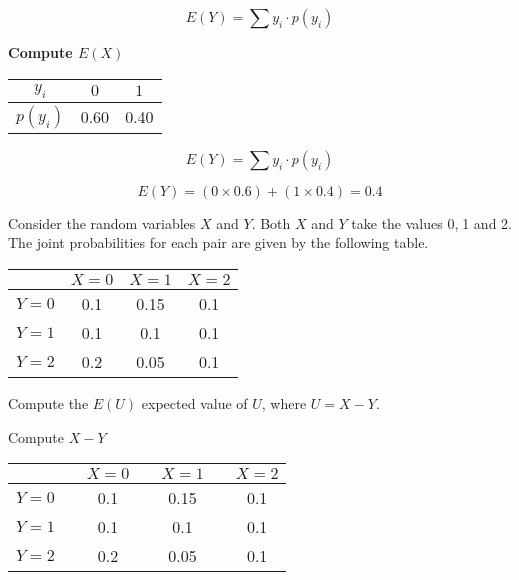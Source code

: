 \documentclass[]{report}
\begin{document}
	\[ E(Y) =  \sum  y_i \cdot p(y_i)   \]
	
	
	
	\textbf{Compute $E(X)$}
	\begin{center}
		\begin{tabular}{|c|c|c|}
			\hline $y_i$ & $0$ & $1$  \\ 
			\hline $p(y_i)$& 0.60 & 0.40 \\
			\hline 
		\end{tabular} 
	\end{center}
	
	\[ E(Y) =  \sum  y_i \cdot p(y_i)   \]
	
	\[ E(Y) = (0 \times 0.6) +  (1 \times 0.4)  =0.4 \]
	
	
	
	
	
	Consider the random variables $X$ and $Y$. Both $X$ and $Y$ take the values 0,$\;$1 and 2. 
	The joint probabilities for each pair are given by the following table.
	\begin{center}
		\begin{tabular}{|c|c|c|c|}
			\hline  & $X=0$ & $X=1$ & $X=2$ \\ 
			\hline $Y=0$ & 0.1 & 0.15 & 0.1 \\ 
			\hline $Y=1$ & 0.1 & 0.1 & 0.1 \\ 
			\hline $Y=2$ & 0.2 & 0.05 & 0.1 \\ 
			\hline 
		\end{tabular} 
	\end{center}
	Compute the $E(U)$ expected value of $U$, where $U=X-Y$.
	
	
	
	
	
	Compute $X-Y$
	\begin{center}
		\begin{tabular}{|c|cc|cc|cc|}
			\hline  & \phantom{space}&$X=0$ &\phantom{space} & $X=1$ & \phantom{space}& $X=2$ \\ 
			\hline $Y=0$& & 0.1 & & 0.15 & & 0.1 \\ 
			\hline $Y=1$& & 0.1 & & 0.1 & & 0.1 \\ 
			\hline $Y=2$& & 0.2 & & 0.05 & & 0.1 \\ 
			\hline 
		\end{tabular} 
	\end{center}
	
\end{document}
